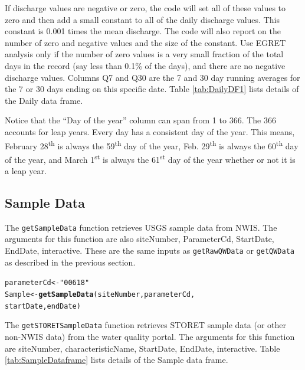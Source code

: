 \documentclass[a4paper,11pt]{article}\usepackage[]{graphicx}\usepackage[]{color}
\makeatletter
\newcommand{\hlstr}[1]{\textcolor[rgb]{0.192,0.494,0.8}{#1}}%
\newcommand{\hlstd}[1]{\textcolor[rgb]{0.345,0.345,0.345}{#1}}%
\newcommand{\hlkwb}[1]{\textcolor[rgb]{0.69,0.353,0.396}{#1}}%
\newcommand{\hlkwd}[1]{\textcolor[rgb]{0.737,0.353,0.396}{\textbf{#1}}}%
\newenvironment{kframe}{%
 \def\at@end@of@kframe{}%
 \ifinner\ifhmode%
  \def\at@end@of@kframe{\end{minipage}}%
  \begin{minipage}{\columnwidth}%
 \fi\fi%
 \def\FrameCommand##1{\hskip\@totalleftmargin \hskip-\fboxsep
 \colorbox{shadecolor}{##1}\hskip-\fboxsep
     \hskip-\linewidth \hskip-\@totalleftmargin \hskip\columnwidth}%
 \MakeFramed {\advance\hsize-\width
   \@totalleftmargin\z@ \linewidth\hsize
   \@setminipage}}%
 {\par\unskip\endMakeFramed%
 \at@end@of@kframe}
\newenvironment{knitrout}{}{} %
\makeatother
\begin{document}
If discharge values are negative or zero, the code will set all of these values to zero and then add a small constant to all of the daily discharge values.  This constant is 0.001 times the mean discharge.  The code will also report on the number of zero and negative values and the size of the constant.  Use EGRET analysis only if the number of zero values is a very small fraction of the total days in the record (say less than 0.1\% of the days), and there are no negative discharge values.  Columns Q7 and Q30 are the 7 and 30 day running averages for the 7 or 30 days ending on this specific date. Table \ref{tab:DailyDF1} lists details of the Daily data frame.

Notice that the \enquote{Day of the year} column can span from 1 to 366. The 366 accounts for leap years. Every day has a consistent day of the year. This means, February 28\textsuperscript{th} is always the 59\textsuperscript{th} day of the year, Feb. 29\textsuperscript{th} is always the 60\textsuperscript{th} day of the year, and March 1\textsuperscript{st} is always the 61\textsuperscript{st} day of the year whether or not it is a leap year.

\FloatBarrier

\subsection{Sample Data}
\label{Samplesubsection}
The \texttt{getSampleData} function retrieves USGS sample data from NWIS. The arguments for this function are also siteNumber, ParameterCd, StartDate, EndDate, interactive. These are the same inputs as \texttt{getRawQWData} or \texttt{getQWData} as described in the previous section.

\begin{knitrout}
\color{fgcolor}\begin{kframe}
\begin{alltt}
\hlstd{parameterCd} \hlkwb{<-} \hlstr{"00618"}
\hlstd{Sample} \hlkwb{<-}\hlkwd{getSampleData}\hlstd{(siteNumber,parameterCd,}
      \hlstd{startDate, endDate)}
\end{alltt}
\end{kframe}
\end{knitrout}

The \texttt{getSTORETSampleData} function retrieves STORET sample data (or other non-NWIS data) from the water quality portal. The arguments for this function are siteNumber, characteristicName, StartDate, EndDate, interactive. Table \ref{tab:SampleDataframe} lists details of the Sample data frame. 
\end{document}
